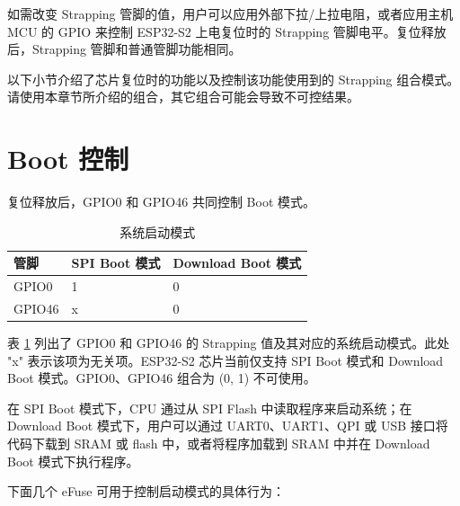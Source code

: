 \documentclass[main\_\_CN.tex]{subfiles}
\begin{document}
如需改变 Strapping 管脚的值，用户可以应用外部下拉/上拉电阻，或者应用主机 MCU 的 GPIO 来控制 ESP32-S2 上电复位时的 Strapping 管脚电平。复位释放后，Strapping 管脚和普通管脚功能相同。

\begin{tiplisting}
以下小节介绍了芯片复位时的功能以及控制该功能使用到的 Strapping 组合模式。请使用本章节所介绍的组合，其它组合可能会导致不可控结果。
\end{tiplisting}

\section{Boot 控制}

复位释放后，GPIO0 和 GPIO46 共同控制 Boot 模式。


\begin{table}[H]
\centering
\caption{系统启动模式}
\label{table:boot_mode}
\begin{tabular}{|p{1.5cm}|p{2.5cm}|p{4.5cm}|}
\hline
\rowcolor{lightgray}
管脚 & SPI Boot 模式 & Download Boot 模式 \\ \hline
GPIO0 & 1 & 0 \\ \hline
GPIO46 & x & 0 \\ \hline
\end{tabular}
\end{table}


表 \ref{table:boot_mode} 列出了 GPIO0 和 GPIO46 的 Strapping 值及其对应的系统启动模式。此处 "x" 表示该项为无关项。ESP32-S2 芯片当前仅支持 SPI Boot 模式和 Download Boot 模式。GPIO0、GPIO46 组合为 (0, 1) 不可使用。

在 SPI Boot 模式下，CPU 通过从 SPI Flash 中读取程序来启动系统；在 Download Boot 模式下，用户可以通过 UART0、UART1、QPI 或 USB 接口将代码下载到 SRAM 或 flash 中，或者将程序加载到 SRAM 中并在 Download Boot 模式下执行程序。

下面几个 eFuse 可用于控制启动模式的具体行为：
\end{document}
